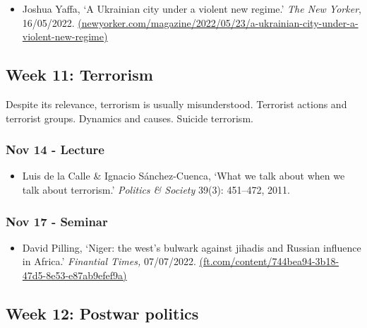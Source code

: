 \documentclass[12pt, a4paper]{article}
\begin{document}
\begin{itemize}
\setlength\itemsep{-5pt}
\item Joshua Yaffa, `A Ukrainian city under a violent new regime.' \textit{The New Yorker}, 16/05/2022. \href{https://www.newyorker.com/magazine/2022/05/23/a-ukrainian-city-under-a-violent-new-regime}{(newyorker.com/magazine/2022/05/23/a-ukrainian-city-under-a-violent-new-regime)}
\end{itemize}


\hline %

\subsection*{Week 11: Terrorism}

Despite its relevance, terrorism is usually misunderstood. Terrorist actions and terrorist groups. Dynamics and causes. Suicide terrorism.

\subsubsection*{Nov 14 - Lecture}

\begin{itemize}
\setlength\itemsep{0pt}
\item Luis de la Calle \& Ignacio Sánchez-Cuenca, `What we talk about when we talk about terrorism.' \textit{Politics \& Society} 39(3): 451--472, 2011.
\end{itemize}

\subsubsection*{Nov 17 - Seminar}

\begin{itemize}
\setlength\itemsep{0pt}
\item David Pilling, `Niger: the west's bulwark against jihadis and Russian influence in Africa.' \textit{Finantial Times,} 07/07/2022. \href{https://www.ft.com/content/744bea94-3b18-47d5-8e53-e87ab9efef9a}{(ft.com/content/744bea94-3b18-47d5-8e53-e87ab9efef9a)}
\end{itemize}

\hline %

\subsection*{Week 12: Postwar politics}
\end{document}
